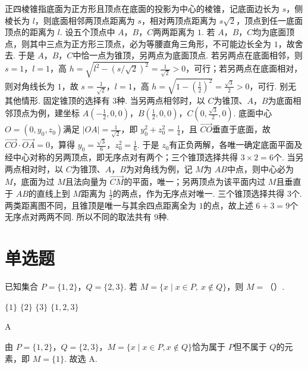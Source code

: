 \begin{solution}
正四棱锥指底面为正方形且顶点在底面的投影为中心的棱锥，记底面边长为 \(s\)，侧棱长为 \(l\)，则底面相邻两顶点距离为 \(s\)，相对两顶点距离为 \(s\sqrt{2}\)，顶点到任一底面顶点的距离为 \(l\). 设五个顶点中 \(A\)，\(B\)，\(C\)两两距离为 \(1\). 若 \(A\)，\(B\)，\(C\)均为底面顶点，则其中三点为正方形三顶点，必为等腰直角三角形，不可能边长全为 \(1\)，故舍去. 于是 \(A\)，\(B\)，\(C\)中恰一点为锥顶，另两点为底面顶点. 若另两点在底面相邻，则 \(s=1\)，\(l=1\)，高 \(h=\sqrt{l^{2}-\left(s/\sqrt{2}\right)^{2}}=\frac{1}{\sqrt{2}}>0\)，可行；若另两点在底面相对，则对角线长为 \(1\)，故 \(s=\frac{1}{\sqrt{2}}\)，\(l=1\)，高 \(h=\sqrt{1-\left(\frac{1}{2}\right)^{2}}=\frac{\sqrt{3}}{2}>0\)，可行. 别无其他情形. 固定锥顶的选择有 \(3\)种. 当另两点相邻时，以 \(C\)为锥顶、\(A\)，\(B\)为底面相邻顶点为例，建坐标 \(A\left(-\frac12,0,0\right)\)，\(B\left(\frac12,0,0\right)\)，\(C\left(0,\frac{\sqrt{3}}{2},0\right)\). 底面中心 \(O=\left(0,y_{0},z_{0}\right)\)满足 \(\left|OA\right|=\frac{1}{\sqrt{2}}\)，即 \(y_{0}^{2}+z_{0}^{2}=\frac14\)，且 \(\overrightarrow{CO}\)垂直于底面，故 \(\overrightarrow{CO}\cdot\overrightarrow{OA}=0\)，算得 \(y_{0}=\frac{\sqrt{3}}{6}\)，\(z_{0}^{2}=\frac16\). 于是 \(z_{0}\)有正负两解，各唯一确定底面平面及经中心对称的另两顶点，即无序点对有两个；三个锥顶选择共得 \(3\times 2=6\)个. 当另两点相对时，以 \(C\)为锥顶、\(A\)，\(B\)为对角线为例，记 \(M\)为 \(AB\)中点，则中心必为 \(M\)，底面为过 \(M\)且法向量为 \(\overrightarrow{CM}\)的平面，唯一；另两顶点为该平面内过 \(M\)且垂直于 \(AB\)的直线上到 \(M\)距离为 \(\frac12\)的两点，作为无序点对唯一. 三个锥顶选择共得 \(3\)个. 两类距离图不同，且锥顶是唯一与其余四点距离全为 \(1\)的点，故上述 \(6+3=9\)个无序点对两两不同. 所以不同的取法共有 \(9\)种.
\end{solution}
\section{单选题}

\begin{problem}
已知集合 \(P=\{1,2\}\)，\(Q=\{2,3\}\). 若 \(M=\{x\mid x\in P,\ x\notin Q\}\)，则 \(M=\)（\quad）.

\choices
    {\(\{1\}\)}
    {\(\{2\}\)}
    {\(\{3\}\)}
    {\(\{1,2,3\}\)}
\end{problem}

\begin{answer}
A
\end{answer}

\begin{solution}
由 \(P=\{1,2\}\)，\(Q=\{2,3\}\)，\(M=\{x\mid x\in P,x\notin Q\}\)恰为属于 \(P\)但不属于 \(Q\)的元素，即 \(M=\{1\}\). 故选 A.
\end{solution}

